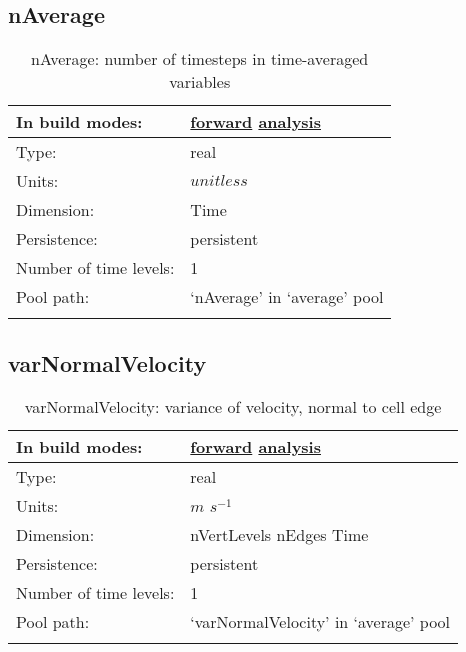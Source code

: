 \subsection[nAverage]{nAverage}
\label{subsec:var_sec_average_nAverage}
\begin{center}
\begin{longtable}{| p{2.0in} | p{4.0in} |}
        \hline 
        In build modes: & \hyperref[subsec:forward_var_tab_average]{forward} \hyperref[subsec:analysis_var_tab_average]{analysis} \\
        \hline 
        Type: & real \\
        \hline 
        Units: & $unitless$ \\
        \hline 
        Dimension: & Time \\
        \hline 
        Persistence: & persistent \\
        \hline 
        Number of time levels: & 1 \\
        \hline 
            Pool path: & `nAverage' in `average' pool \\
		 \hline 
    \caption{nAverage: number of timesteps in time-averaged variables}
\end{longtable}
\end{center}
\subsection[varNormalVelocity]{varNormalVelocity}
\label{subsec:var_sec_average_varNormalVelocity}
\begin{center}
\begin{longtable}{| p{2.0in} | p{4.0in} |}
        \hline 
        In build modes: & \hyperref[subsec:forward_var_tab_average]{forward} \hyperref[subsec:analysis_var_tab_average]{analysis} \\
        \hline 
        Type: & real \\
        \hline 
        Units: & $m$ $s^{-1}$ \\
        \hline 
        Dimension: & nVertLevels nEdges Time \\
        \hline 
        Persistence: & persistent \\
        \hline 
        Number of time levels: & 1 \\
        \hline 
            Pool path: & `varNormalVelocity' in `average' pool \\
		 \hline 
    \caption{varNormalVelocity: variance of velocity, normal to cell edge}
\end{longtable}
\end{center}
